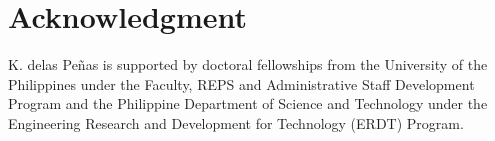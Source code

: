 \documentclass[journal]{IEEEtran}
\begin{document}
\section*{Acknowledgment}
K. delas Pe\~nas is supported by doctoral fellowships from the University of the Philippines under the Faculty, REPS and Administrative Staff Development Program and the Philippine Department of Science and Technology under the Engineering Research and Development for Technology (ERDT) Program.


\ifCLASSOPTIONcaptionsoff
  \newpage
\fi





%


%




\end{document}
